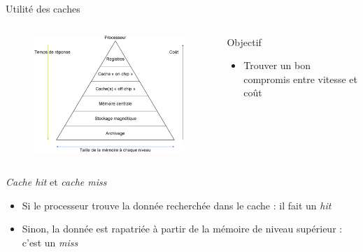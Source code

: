 \begin{frame}{Utilité des caches}
	\begin{columns}[c]
		\begin{column}{.5\textwidth}
			\begin{figure}[h!]
				\includegraphics[scale=.45]{images/hierarchy.png}
			\end{figure}
		\end{column}
		\begin{column}{.5\textwidth}
			\begin{block}{Objectif}
				\begin{itemize}
					\item{Trouver un bon compromis entre vitesse et coût}
				\end{itemize}
			\end{block}
		\end{column}
	\end{columns}
	\begin{block}{\emph{Cache hit} et \emph{cache miss}}
		\begin{itemize}
			\item{Si le processeur trouve la donnée recherchée dans le cache : il fait un \emph{hit}}
			\item{Sinon, la donnée est rapatriée à partir de la mémoire de niveau supérieur : c'est un \emph{miss}}			
			\end{itemize}
	\end{block}
\end{frame}


